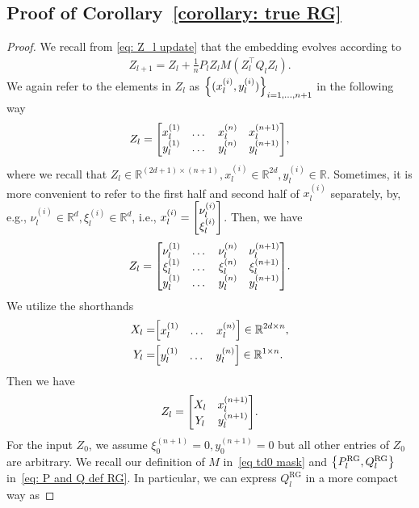 \documentclass{article}
\newcommand{\R}{\mathbb{R}}
\newcommand{\rg}{\text{RG}}
\begin{document}
\subsection{Proof of Corollary~\ref{corollary: true RG}}
\label{sec proof of corollary true RG}
\begin{proof}
    We recall from \eqref{eq: Z_l update} that the embedding evolves according to
    \begin{align}
        Z_{l+1} = Z_l + \frac{1}{n} P_l Z_l M(Z_l^\top Q_l Z_l).
    \end{align}
    We again refer to the elements in $Z_l$ as $\qty{(x^{(i)}_l, y^{(i)}_l)}_{i=1,\dots, n+1}$ in the following way
    \begin{align}
        Z_l = \mqty[x_l^{(1)} & \dots & x_l^{(n)} & x_l^{(n+1)} \\
                    y_l^{(1)} & \dots & y_l^{(n)} & y_l^{(n+1)}],
    \end{align}
    where we recall that $Z_l \in \R^{(2d + 1) \times (n+1)}, x_l^{(i)} \in \R^{2d}, y^{(i)}_l \in \R$.
    Sometimes, it is more convenient to refer to the first half and second half of $x_l^{(i)}$ separately,
    by, e.g., $\nu^{(i)}_l \in \R^d, \xi_l^{(i)} \in \R^d$, i.e., $x_l^{(i)} = \mqty[\nu_l^{(i)} \\ \xi_l^{(i)}]$.
    Then, we have
    \begin{align}
        Z_l = \mqty[\nu_l^{(1)} & \dots & \nu_l^{(n)} & \nu_l^{(n+1)} \\
        \xi_l^{(1)} & \dots & \xi_l^{(n)} & \xi_l^{(n+1)} \\
         y_l^{(1)} & \dots & y_l^{(n)} & y_l^{(n+1)}].
    \end{align}
    We utilize the shorthands
    \begin{align}
        X_l =& \mqty[x_l^{(1)} & \dots & x_l^{(n)}] \in \R^{2d \times n}, \\
        Y_l =&  \mqty[y_l^{(1)} & \dots & y_l^{(n)}] \in \R^{1 \times n}.
    \end{align}
    Then we have
    \begin{align}
        Z_l = \mqty[X_l & x_l^{(n+1)} \\
                    Y_l & y_l^{(n+1)}].
    \end{align}
    For the input $Z_0$,
    we assume $\xi_0^{(n+1)} = 0, y_0^{(n+1)} = 0$ but all other entries of $Z_0$ are arbitrary.
    We recall our definition of $M$ in~\eqref{eq td0 mask} and $\qty{P_l^{\rg}, Q_l^{\rg}}$ in~\eqref{eq: P and Q def RG}.
    In particular,
    we can express $Q_l^{\rg}$ in a more compact way as

\end{proof}
\end{document}
